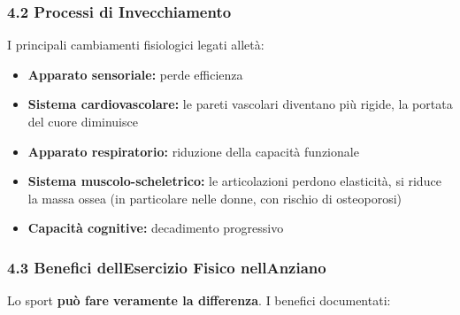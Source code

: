 \documentclass[a4paper,11pt]{article}
\providecommand{\tightlist}{%
  \setlength{\itemsep}{0pt}\setlength{\parskip}{0pt}}
\begin{document}
\subsubsection{4.2 Processi di
      Invecchiamento}\label{processi-di-invecchiamento}

I principali cambiamenti fisiologici legati all\textquotesingle età:

\begin{itemize}
      \tightlist
      \item
            \textbf{Apparato sensoriale:} perde efficienza
      \item
            \textbf{Sistema cardiovascolare:} le pareti vascolari diventano più
            rigide, la portata del cuore diminuisce
      \item
            \textbf{Apparato respiratorio:} riduzione della capacità funzionale
      \item
            \textbf{Sistema muscolo-scheletrico:} le articolazioni perdono
            elasticità, si riduce la massa ossea (in particolare nelle donne, con
            rischio di osteoporosi)
      \item
            \textbf{Capacità cognitive:} decadimento progressivo
\end{itemize}

\subsubsection{4.3 Benefici dell\textquotesingle Esercizio Fisico
      nell\textquotesingle Anziano}\label{benefici-dellesercizio-fisico-nellanziano}

Lo sport \textbf{può fare veramente la differenza}. I benefici
documentati:
\end{document}
